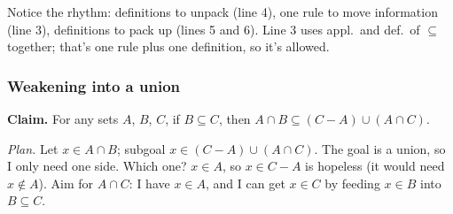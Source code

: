 \begin{center}
\end{center}

Notice the rhythm: definitions to unpack (line 4), one rule to move information (line 3), definitions to pack up (lines 5 and 6). Line 3 uses appl.\ and def.\ of $\subseteq$ together; that's one rule plus one definition, so it's allowed.

\subsubsection{Weakening into a union}

\textbf{Claim.} For any sets $A$, $B$, $C$, if $B\subseteq C$, then $A\cap B\subseteq (C-A)\cup(A\cap C)$.

\emph{Plan.} Let $x\in A\cap B$; subgoal $x\in (C-A)\cup(A\cap C)$. The goal is a union, so I only need one side. Which one? $x\in A$, so $x\in C-A$ is hopeless (it would need $x\notin A$). Aim for $A\cap C$: I have $x\in A$, and I can get $x\in C$ by feeding $x\in B$ into $B\subseteq C$.

